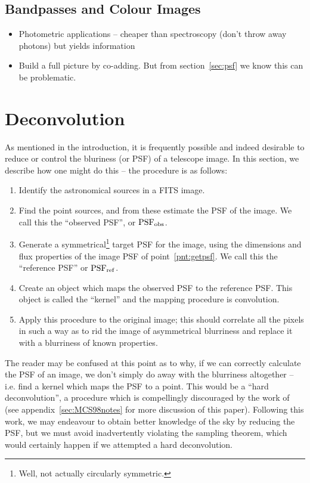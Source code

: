 \documentclass[letterpaper, 11pt]{article}
\def\psfobs{\ensuremath{{\rm PSF_{obs}}}\xspace}
\def\psfref{\ensuremath{{\rm PSF_{ref}}}\xspace}
\begin{document}
\subsection{Bandpasses and Colour Images}
\label{sec:bands}

\begin{itemize}
	\item Photometric applications -- cheaper than spectroscopy (don't throw away photons) but yields information
	\item Build a full picture by co-adding. But from section~\ref{sec:psf} we know this can be problematic.
\end{itemize}

\newpage
\section{Deconvolution}
\label{sec:deconvolution}

As mentioned in the introduction, it is frequently possible and indeed desirable to reduce or control the bluriness (or PSF) of a telescope image. In this section, we describe how one might do this -- the procedure is as follows:

\begin{enumerate}
	\item Identify the astronomical sources in a FITS image.
	\item Find the point sources, and from these estimate the PSF of the image. We call this the ``observed PSF'', or \psfobs.\label{pnt:getpsf}
	\item Generate a symmetrical\footnote{Well, not actually circularly symmetric.} target PSF for the image, using the dimensions and flux properties of the image PSF of point~\ref{pnt:getpsf}. We call this the ``reference PSF'' or \psfref.\label{pnt:PSF0}
	\item Create an object which maps the observed PSF to the reference PSF. This object is called the ``kernel'' and the mapping procedure is convolution.
	\item Apply this procedure to the original image; this should correlate all the pixels in such a way as to rid the image of asymmetrical blurriness and replace it with a blurriness of known properties.
\end{enumerate}

The reader may be confused at this point as to why, if we can correctly calculate the PSF of an image, we don't simply do away with the blurriness altogether -- i.e. find a kernel which maps the PSF to a point. This would be a ``hard deconvolution'', a procedure which is compellingly discouraged by the work of \cite{MCS98} (see appendix~\ref{sec:MCS98notes} for more discussion of this paper). Following this work, we may endeavour to obtain better knowledge of the sky by reducing the PSF, but we must avoid inadvertently violating the sampling theorem, which would certainly happen if we attempted a hard deconvolution.
\end{document}
